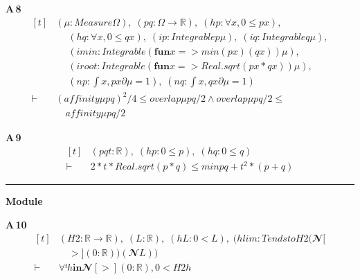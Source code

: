 \noindent\textbf{A\,8}\quad{}
{\footnotesize\[ \begin{aligned}[t]
&(\mu : \mathit{Measure} \Omega ),\; (\mathit{p} \mathit{q} : \Omega \to \mathbb{R} ),\; (\mathit{hp} : \forall \mathit{x}, 0 \leq \mathit{p} \mathit{x}),\\
&\quad \; (\mathit{hq} : \forall \mathit{x}, 0 \leq \mathit{q} \mathit{x}),\; (\mathit{ip} : \mathit{Integrable} \mathit{p} \mu ),\; (\mathit{iq} : \mathit{Integrable} \mathit{q} \mu ),\\
&\quad \; (\mathit{imin} : \mathit{Integrable} (\mathbf{fun} \mathit{x} => \mathit{min} (\mathit{p} \mathit{x}) (\mathit{q} \mathit{x})) \mu ),\\
&\quad \; (\mathit{iroot} : \mathit{Integrable} (\mathbf{fun} \mathit{x} => \mathit{Real}.\mathit{sqrt} (\mathit{p} \mathit{x}*\mathit{q} \mathit{x})) \mu ),\\
&\quad \; (\mathit{np} : \int \mathit{x}, \mathit{p} \mathit{x} ∂\mu = 1),\; (\mathit{nq} : \int \mathit{x}, \mathit{q} \mathit{x} ∂\mu = 1)\\
\vdash\;&(\mathit{affinity} \mu \mathit{p} \mathit{q})^{2}/4 \leq \mathit{overlap} \mu \mathit{p} \mathit{q}/2 \wedge \mathit{overlap} \mu \mathit{p} \mathit{q}/2 \leq\\
&\quad \mathit{affinity} \mu \mathit{p} \mathit{q}/2
\end{aligned} \]}

\noindent\textbf{A\,9}\quad{}
{\footnotesize\[ \begin{aligned}[t]
&(\mathit{p} \mathit{q} \mathit{t} : \mathbb{R} ),\; (\mathit{hp} : 0 \leq \mathit{p}),\; (\mathit{hq} : 0 \leq \mathit{q})\\
\vdash\;&2*\mathit{t}*\mathit{Real}.\mathit{sqrt} (\mathit{p}*\mathit{q}) \leq \mathit{min} \mathit{p} \mathit{q} + \mathit{t}^{2}*(\mathit{p}+\mathit{q})
\end{aligned} \]}

\vspace{4pt}\noindent\rule{\columnwidth}{0.4pt}\par\vspace{2pt}
\noindent\textbf{Module }\par\vspace{3pt}

\noindent\textbf{A\,10}\quad{}
{\footnotesize\[ \begin{aligned}[t]
&(\mathit{H2} : \mathbb{R} \to \mathbb{R} ),\; (\mathit{L} : \mathbb{R} ),\; (\mathit{hL} : 0 < \mathit{L}),\; (\mathit{hlim} : \mathit{Tendsto} \mathit{H2} (𝓝[\\
&\quad >] (0:\mathbb{R} )) (𝓝 \mathit{L}))\\
\vdash\;&\forall  ᶠ \mathit{h} \mathbf{in} 𝓝[>] (0:\mathbb{R} ), 0 < \mathit{H2} \mathit{h}
\end{aligned} \]}


